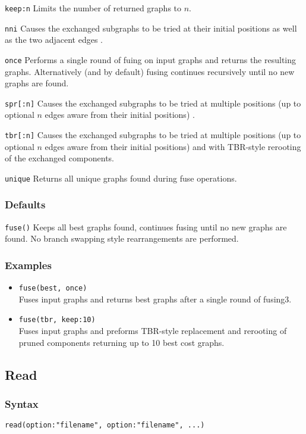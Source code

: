 \documentclass[11pt]{article}
\begin{document}
		\smallskip		
		\noindent \texttt{keep:n} Limits the number of returned graphs to $n$.  
		
		\smallskip		
		\noindent \texttt{nni} Causes the exchanged subgraphs to be tried at their initial positions  as well as the two adjacent edges .
		
		\smallskip		
		\noindent \texttt{once} Performs a single round of fuing on input graphs and returns the resulting graphs. Alternatively (and by default) fusing continues recursively until  no new graphs are found.
		
		\smallskip		
		\noindent \texttt{spr[:n]} Causes the exchanged subgraphs to be tried at multiple positions (up to optional $n$ edges aware from their initial positions) .
		
		\smallskip		
		\noindent \texttt{tbr[:n]} Causes the exchanged subgraphs to be tried at multiple positions (up to optional $n$ edges aware from their initial positions) and with TBR-style 
		rerooting of the exchanged components.
		
		\smallskip		
		\noindent \texttt{unique} Returns all unique graphs found during fuse operations.		
	
		\subsubsection{Defaults}
			\texttt{fuse()} Keeps all best graphs found, continues fusing until no new graphs are found. No branch swapping style rearrangements are performed.
		\subsubsection{Examples}
		\begin{itemize}
			\item{\texttt{fuse(best, once)}\\Fuses input graphs and returns best graphs after a single round of fusing3.}
			\item{\texttt{fuse(tbr, keep:10)} \\Fuses input graphs and preforms TBR-style replacement and rerooting of pruned components returning up to 10 best cost graphs.}
		\end{itemize}
	
	\subsection{Read}
		\subsubsection{Syntax}
				\texttt{read(option:"filename", option:"filename", ...)}
			
\end{document}
